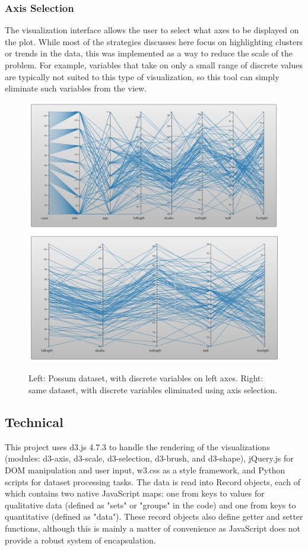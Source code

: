\documentclass[]{article}
\begin{document}
		\subsubsection{Axis Selection}
		The visualization interface allows the user to select what axes to be displayed on the plot. While most of the strategies discusses here focus on highlighting clusters or trends in the data, this was implemented as a way to reduce the scale of the problem. For example, variables that take on only a small range of discrete values are typically not suited to this type of visualization\cite{kosara}, so this tool can simply eliminate such variables from the view.
		\begin{figure}[h]
			\includegraphics[width=\linewidth/2]{possum_bad.png}
			\includegraphics[width=\linewidth/2]{possum_good.png}
			\caption{Left: Possum dataset\cite{datasets}, with discrete variables on left axes. Right: same dataset, with discrete variables eliminated using axis selection.}
			\label{fig:Axis}
		\end{figure}
	\subsection{Technical}
		This project uses d3.js 4.7.3 to handle the rendering of the visualizations (modules: d3-axis, d3-scale, d3-selection, d3-brush, and d3-shape), jQuery.js for DOM manipulation and user input, w3.css as a style framework, and Python scripts for dataset processing tasks. The data is read into Record objects, each of which contains two native JavaScript maps: one from keys to values for qualitative data (defined as "sets" or "groups" in the code) and one from keys to quantitative (defined as "data"). These record objects also define getter and setter functions, although this is mainly a matter of convenience as JavaScript does not provide a robust system of encapsulation.
\end{document}
